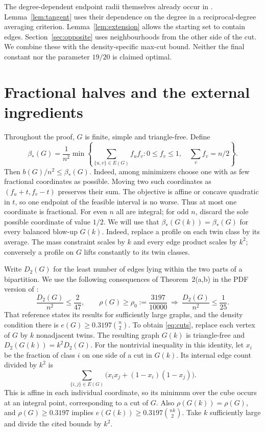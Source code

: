 \documentclass[12pt]{article}
\newcommand{\B}{\beta_*}
\begin{document}
The degree-dependent endpoint radii themselves already occur in
\cite{sarid}. Lemma~\ref{lem:tangent} uses their dependence on the degree
in a reciprocal-degree averaging criterion.
Lemma~\ref{lem:extension} allows the starting set to contain edges.
Section~\ref{sec:opposite} uses neighbourhoods from the other side of
the cut. We combine these with the density-specific max-cut bound.
Neither the final constant nor the parameter $19/20$ is claimed optimal.

\section{Fractional halves and the external ingredients}
Throughout the proof, $G$ is finite, simple and triangle-free.
Define
\[
 \B(G)=\frac1{n^2}\min\left\{
 \sum_{\{u,v\}\in E(G)}f_uf_v:
 0\le f_v\le1,\quad\sum_v f_v=n/2\right\}.
\]
Then $b(G)/n^2\le\B(G)$. Indeed, among minimizers choose one with as few
fractional coordinates as possible. Moving two such coordinates as
$(f_u+t,f_v-t)$ preserves their sum. The objective is affine or concave
quadratic in $t$, so one endpoint of the feasible interval is no worse.
Thus at most one coordinate is fractional. For even $n$ all are integral;
for odd $n$, discard the sole possible coordinate of value $1/2$.
We will use that $\B(G(k))=\B(G)$ for every balanced blow-up $G(k)$.
Indeed, replace a profile on each twin class by its average. The mass
constraint scales by $k$ and every edge product scales by $k^2$;
conversely a profile on $G$ lifts constantly to its twin classes.

Write $D_2(G)$ for the least number of edges lying within the two parts of
a bipartition. We use the following consequences of Theorem~2(a,b) in the
PDF version of \cite{bcl}:
\begin{equation}\label{eq:cuts}
 \frac{D_2(G)}{n^2}\le\frac2{47},\qquad
 \rho(G)\ge\rho_0:=\frac{3197}{10000}
 \ \Longrightarrow\ \frac{D_2(G)}{n^2}\le\frac1{25}.
\end{equation}
That reference states its results for sufficiently large graphs, and the
density condition there is $e(G)\ge0.3197\binom n2$. To obtain
\eqref{eq:cuts}, replace each vertex of $G$ by $k$ nonadjacent twins.
The resulting graph $G(k)$ is triangle-free and
$D_2(G(k))=k^2D_2(G)$. For the nontrivial inequality in this identity,
let $x_i$ be the fraction of class $i$ on one side of a cut in $G(k)$.
Its internal edge count divided by $k^2$ is
\[
 \sum_{\{i,j\}\in E(G)}\bigl(x_ix_j+(1-x_i)(1-x_j)\bigr).
\]
This is affine in each individual coordinate, so its minimum over the
cube occurs at an integral point, corresponding to a cut of $G$.
Also $\rho(G(k))=\rho(G)$, and $\rho(G)\ge0.3197$ implies
$e(G(k))\ge0.3197\binom{nk}{2}$. Take $k$ sufficiently large and divide
the cited bounds by $k^2$.
\end{document}

